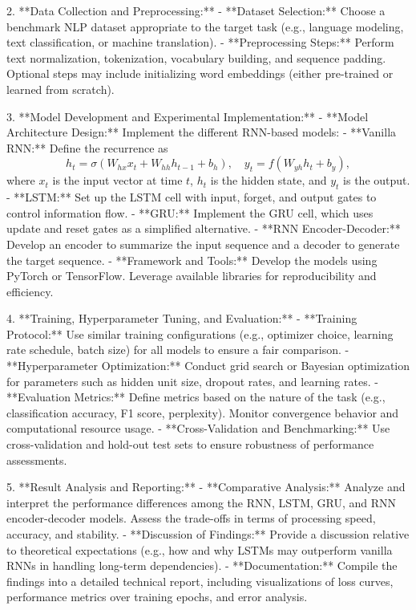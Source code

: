 \documentclass[12pt,a4paper]{article}
\begin{document}
2. **Data Collection and Preprocessing:**
   - **Dataset Selection:**  
     Choose a benchmark NLP dataset appropriate to the target task (e.g., language modeling, text classification, or machine translation).
   - **Preprocessing Steps:**  
     Perform text normalization, tokenization, vocabulary building, and sequence padding. Optional steps may include initializing word embeddings (either pre-trained or learned from scratch).

3. **Model Development and Experimental Implementation:**
   - **Model Architecture Design:**  
     Implement the different RNN-based models:
     - **Vanilla RNN:**  
       Define the recurrence as  
       \[
       h_t = \sigma(W_{hx} x_t + W_{hh} h_{t-1} + b_h), \quad y_t = f(W_{yh} h_t + b_y),
       \]
       where \(x_t\) is the input vector at time \(t\), \(h_t\) is the hidden state, and \(y_t\) is the output.
     - **LSTM:**  
       Set up the LSTM cell with input, forget, and output gates to control information flow.
     - **GRU:**  
       Implement the GRU cell, which uses update and reset gates as a simplified alternative.
     - **RNN Encoder-Decoder:**  
       Develop an encoder to summarize the input sequence and a decoder to generate the target sequence.
   - **Framework and Tools:**  
     Develop the models using PyTorch or TensorFlow. Leverage available libraries for reproducibility and efficiency.

4. **Training, Hyperparameter Tuning, and Evaluation:**
   - **Training Protocol:**  
     Use similar training configurations (e.g., optimizer choice, learning rate schedule, batch size) for all models to ensure a fair comparison.
   - **Hyperparameter Optimization:**  
     Conduct grid search or Bayesian optimization for parameters such as hidden unit size, dropout rates, and learning rates.
   - **Evaluation Metrics:**  
     Define metrics based on the nature of the task (e.g., classification accuracy, F1 score, perplexity). Monitor convergence behavior and computational resource usage.
   - **Cross-Validation and Benchmarking:**  
     Use cross-validation and hold-out test sets to ensure robustness of performance assessments.

5. **Result Analysis and Reporting:**
   - **Comparative Analysis:**  
     Analyze and interpret the performance differences among the RNN, LSTM, GRU, and RNN encoder-decoder models. Assess the trade-offs in terms of processing speed, accuracy, and stability.
   - **Discussion of Findings:**  
     Provide a discussion relative to theoretical expectations (e.g., how and why LSTMs may outperform vanilla RNNs in handling long-term dependencies).
   - **Documentation:**  
     Compile the findings into a detailed technical report, including visualizations of loss curves, performance metrics over training epochs, and error analysis.
\end{document}
